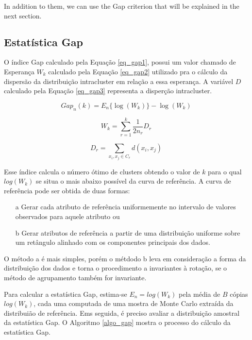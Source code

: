 \iffalse
In addition to them, we can use the Gap criterion that will be explained in the next section.
\subsection{Estatística Gap}
O índice Gap \cite{Tibshirani2001b} calculado pela Equação \ref{eq_gap1}, possui um valor chamado de Esperança $W_k$ calculado pela Equação \ref{eq_gap2} utilizado pra o cálculo da dispersão da distribuição intracluster em relação a essa esperança. A variável $D$ calculado pela Equação \ref{eq_gap3} representa a disperção intracluster. 

\begin{equation}
\label{eq_gap1}
    Gap_n(k)=E_n\{\log(W_k)\}-\log(W_k)
\end{equation}

\begin{equation}
\label{eq_gap2}
W_k=\sum_{r=1}^k \frac{1}{2n_r}D_r    
\end{equation}

\begin{equation}
\label{eq_gap3}
    D_r=\sum_{x_i,x_j \in C_r} d(x_i,x_j)
\end{equation}

Esse índice calcula o número ótimo de clusters obtendo o valor de $k$ para o qual $log(W_k)$ se situa o mais abaixo possível da curva de referência. A curva de referência pode ser obtida de duas formas:

\begin{itemize}
    \item[a] Gerar cada atributo de referência uniformemente no intervalo de valores observados para aquele atributo ou
    \item[b] Gerar atributos de referência a partir de uma distribuição uniforme sobre um retângulo alinhado com os componentes principais dos dados.
\end{itemize}

O método a é mais simples, porém o métdodo b leva em consideração a forma da distribuição dos dados e torna o procedimento a invariantes à rotação, se o método de agrupamento também for invariante. 

Para calcular a estatística Gap, estima-se $E_n=log(W_k)$ pela média de $B$ cópias $log(W_k)$, cada uma computada de uma mostra de Monte Carlo extraída da distribuião de referência. Ems seguida, é preciso avaliar a distribuição amostral da estatística Gap. O Algoritmo \ref{algo_gap} mostra o processo do cálculo da estatística Gap.
 
